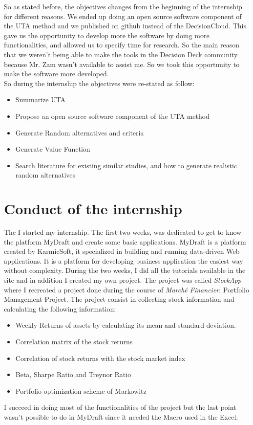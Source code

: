 \documentclass{report}
\begin{document}
So as stated before, the objectives changes from the beginning of the internship for different reasons. We ended up doing an open source software component of the UTA method and we published on github instead of the DecisionCloud. This gave us the opportunity to develop more the software by doing more functionalities, and allowed us to specify time for research. So the main reason that we weren't being able to make the tools in the Decision Deck community because Mr. Zam wasn't available to assist me. So we took this opportunity to make the software more developed.\\
So during the internship the objectives were re-stated as follow: 
\begin{itemize}
\item Summarize UTA
\item Propose an open source software component of the UTA method
\item Generate Random alternatives and criteria
\item Generate Value Function
\item Search literature for existing similar studies, and how to generate realistic random alternatives
\end{itemize}

\section{Conduct of the internship}
The  I started my internship. The first two weeks, was dedicated to get to know the platform MyDraft and create some basic applications. MyDraft is a platform created by KarmicSoft, it specialized in building and running data-driven Web applications. It is a platform for developing business application the easiest way without complexity. During the two weeks, I did all the tutorials available in the site and in addition I created my own project. The project was called \textit{StockApp} where I recreated a project done during the course of \textit{Marché Financier}: Portfolio Management Project. The project consist in collecting stock information and calculating the following information: 
\begin{itemize}
\item Weekly Returns of assets by calculating its mean and standard deviation. 
\item Correlation matrix of the stock returns
\item Correlation of stock returns with the stock market index
\item Beta, Sharpe Ratio and Treynor Ratio
\item Portfolio optimization scheme of Markowitz
\end{itemize}
I succeed in doing most of the functionalities of the project but the last point wasn't possible to do in MyDraft since it needed the Macro used in the Excel.\\
\end{document}

